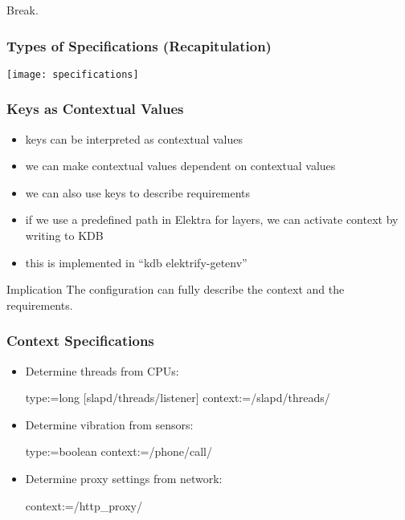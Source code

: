 \begin{assignment}
	\begin{task}
	Break.
	\end{task}
\end{assignment}

\begin{frame}
	\frametitle{Types of Specifications (Recapitulation)}
	\texttt{[image: specifications]}
\end{frame}

\begin{frame}
	\frametitle{Keys as Contextual Values}

	\begin{itemize}[<+-| alert@+>]
	\item keys can be interpreted as contextual values~\cite{raab2016persistent,raab2017introducing}
	\item we can make contextual values dependent on contextual values
	\item we can also use keys to describe requirements
	\item if we use a predefined path in Elektra for layers, we can activate context by writing to KDB
	\item this is implemented in ``kdb elektrify-getenv''
	\end{itemize}

	\pause[\thebeamerpauses]

	\begin{alertblock}{Implication}
	The configuration can fully describe the context and the requirements.
	\end{alertblock}
\end{frame}

\begin{frame}[fragile]
	\frametitle{Context Specifications}

	\begin{itemize}
	\item
	Determine threads from CPUs:

	\begin{code}
	  type:=long
	[slapd/threads/listener]
	  context:=/slapd/threads/%
	\end{code}

	\item
	Determine vibration from sensors:

	\begin{code}
	  type:=boolean
	  context:=/phone/call/%
	\end{code}

	\item
	Determine proxy settings from network:

	\begin{code}
	  context:=/http_proxy/%
	\end{code}
	\end{itemize}
\end{frame}


